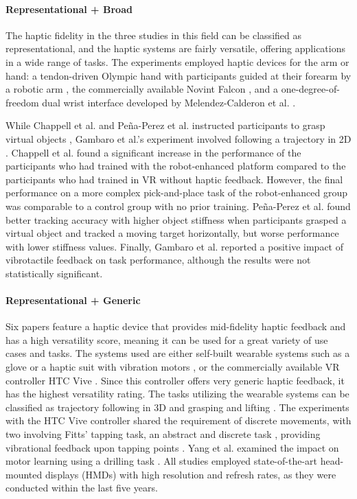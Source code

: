 \paragraph{Representational + Broad} \label{sec:representationalbroad}
The haptic fidelity in the three studies in this field can be classified as representational, and the haptic systems are fairly versatile, offering applications in a wide range of tasks. The experiments employed haptic devices for the arm or hand: a tendon-driven Olympic hand with participants guided at their forearm by a robotic arm \cite{Chappell2022}, the commercially available Novint Falcon \cite{Gambaro2014}, and a one-degree-of-freedom dual wrist interface \cite{Perez2023} developed by Melendez-Calderon et al. \cite{Melendez-Calderon2011Hi5:Control}.

While Chappell et al. and Peña-Perez et al. instructed participants to grasp virtual objects \cite{Chappell2022, Perez2023}, Gambaro et al.'s experiment involved following a trajectory in 2D \cite{Gambaro2014}. 
Chappell et al. found a significant increase in the performance of the participants who had trained with the robot-enhanced platform compared to the participants who had trained in VR without haptic feedback. However, the final performance on a more complex pick-and-place task of the robot-enhanced group was comparable to a control group with no prior training. 
Peña-Perez et al. found better tracking accuracy with higher object stiffness when participants grasped a virtual object and tracked a moving target horizontally, but worse performance with lower stiffness values.
Finally, Gambaro et al. reported a positive impact of vibrotactile feedback on task performance, although the results were not statistically significant. 


\paragraph{Representational + Generic} \label{sec:representationalgeneric}
Six papers feature a haptic device that provides mid-fidelity haptic feedback and has a high versatility score, meaning it can be used for a great variety of use cases and tasks. The systems used are either self-built wearable systems such as a glove \cite{LiuH2019, Trinitatova2023} or a haptic suit with vibration motors \cite{Xia2023}, or the commercially available VR controller HTC Vive \cite{Vasudevan2020, Yang2023, McAnally2023}. Since this controller offers very generic haptic feedback, it has the highest versatility rating. 
The tasks utilizing the wearable systems can be classified as trajectory following in 3D \cite{Trinitatova2023, Xia2023} and grasping and lifting \cite{LiuH2019}. The experiments with the HTC Vive controller shared the requirement of discrete movements, with two involving Fitts' tapping task, an abstract and discrete task \cite{Fitts1954TheMovement}, providing vibrational feedback upon tapping points \cite{Vasudevan2020, McAnally2023}. Yang et al. examined the impact on motor learning using a drilling task \cite{Yang2023}. All studies employed state-of-the-art head-mounted displays (HMDs) with high resolution and refresh rates, as they were conducted within the last five years.

